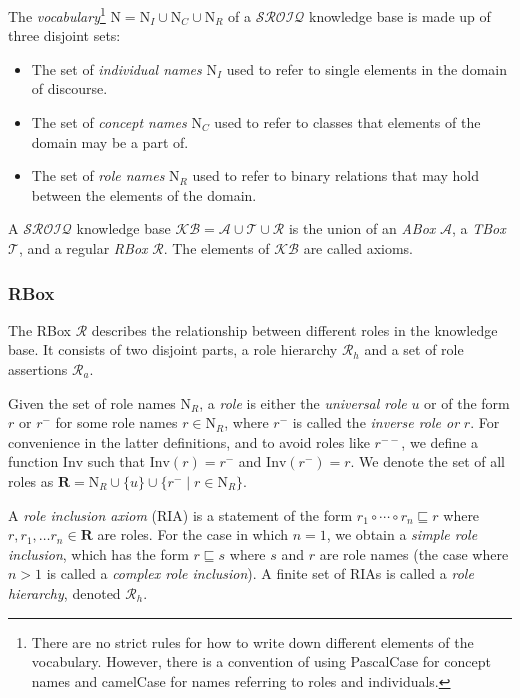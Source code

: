 
The \emph{vocabulary}\footnote{There are no strict rules for how to write down different elements of the vocabulary. However, there is a convention of using PascalCase for concept names and camelCase for names referring to roles and individuals.} $\mathrm{N} = \mathrm{N}_I \cup \mathrm{N}_C \cup \mathrm{N}_R$ of a $\mathcal{SROIQ}$ knowledge base is made up of three disjoint sets:

\begin{itemize}
    \item The set of \emph{individual names} $\mathrm{N}_I$ used to refer to single elements in the domain of discourse.
    \item The set of \emph{concept names} $\mathrm{N}_C$ used to refer to classes that elements of the domain may be a part of.
    \item The set of \emph{role names} $\mathrm{N}_R$ used to refer to binary relations that may hold between the elements of the domain.
\end{itemize}

A $\mathcal{SROIQ}$ knowledge base $\mathcal{KB} = \mathcal{A} \cup \mathcal{T} \cup \mathcal{R}$ is the union of an \emph{ABox} $\mathcal{A}$, a \emph{TBox} $\mathcal{T}$, and a regular \emph{RBox} $\mathcal{R}$. The elements of $\mathcal{KB}$ are called axioms.

\subsubsection{RBox} \label{rbox}

The RBox $\mathcal{R}$ describes the relationship between different roles in the knowledge base. It consists of two disjoint parts, a role hierarchy $\mathcal{R}_h$ and a set of role assertions $\mathcal{R}_a$.

Given the set of role names $\mathrm{N}_R$, a \emph{role} is either the \emph{universal role} $u$ or of the form $r$ or $r^-$ for some role names $r \in \mathrm{N}_R$, where $r^-$ is called the \emph{inverse role or} $r$. For convenience in the latter definitions, and to avoid roles like $r^{--}$, we define a function $\mathrm{Inv}$ such that $\mathrm{Inv}(r) = r^-$ and $\mathrm{Inv}(r^-) = r$. We denote the set of all roles as $\mathbf{R} = \mathrm{N}_R \cup \{ u \} \cup \{ r^- \mid r \in \mathrm{N}_R \}$.

A \emph{role inclusion axiom} (RIA) is a statement of the form $r_1 \circ \cdots \circ r_n \sqsubseteq r$ where $r, r_1, \dots r_n \in \mathbf{R}$ are roles. For the case in which $n = 1$, we obtain a \emph{simple role inclusion}, which has the form $r \sqsubseteq s$ where $s$ and $r$ are role names (the case where $n > 1$ is called a \emph{complex role inclusion}). A finite set of RIAs is called a \emph{role hierarchy}, denoted $\mathcal{R}_h$.

